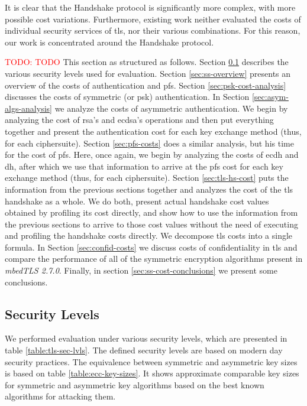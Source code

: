 \documentclass{llncs}
\newcommand{\todo}[1]{\textcolor{red}{TODO: #1}\PackageWarning{TODO:}{#1!}}
\begin{document}
It is clear that the Handshake protocol is significantly more complex, with more possible cost variations.
Furthermore, existing work neither evaluated the costs of individual security services of \gls{tls}, nor
their various combinations. For this reason, our work is concentrated around the Handshake protocol.

\todo{TODO}
This section as structured as follows. Section \ref{sec:sls} describes the various security levels used for evaluation. Section \ref{sec:ss-overview}
presents an overview of the costs of authentication and \gls{pfs}. Section \ref{sec:psk-cost-analysis} discusses the costs of symmetric (or \gls{psk})
authentication. In Section \ref{sec:asym-algs-analysis} we analyze the costs of asymmetric authentication. We begin by analyzing the cost of \gls{rsa}'s
and \gls{ecdsa}'s  operations and then put everything together and present the authentication cost for each key exchange method (thus, for each ciphersuite).
Section \ref{sec:pfs-costs} does a similar analysis, but his time for the cost of \gls{pfs}. Here, once again, we begin by analyzing the costs of
\gls{ecdh} and \gls{dh}, after which we use that information to arrive at the \gls{pfs} cost for each key exchange method (thus, for each ciphersuite).
Section \ref{sec:tls-hs-cost} puts the information from the previous sections together and analyzes the cost of the \gls{tls} handshake as a whole.
We do both, present actual handshake cost values obtained by profiling its cost directly, and show how to use the information from the previous sections to 
arrive to those cost values without the need of executing and profiling the handshake costs directly. We decompose \gls{tls} costs into a single formula.
In Section \ref{sec:confid-costs} we discuss costs of confidentiality in \gls{tls} and compare the performance of all of the symmetric encryption algorithms
present in \textit{mbedTLS 2.7.0}. Finally, in section \ref{sec:ss-cost-conclusions} we present some conclusions.

\subsection{Security Levels} \label{sec:sls}

We performed evaluation under various security levels, which are presented in table \ref{table:tls-sec-lvls}.
The defined security levels are based on modern day security practices. The equivalence between symmetric and asymmetric
key sizes  is based on table \ref{table:ecc-key-sizes}. It shows approximate comparable key sizes for symmetric
and asymmetric key algorithms based on the best known algorithms for attacking them\cite{RFC4492}.
\end{document}

